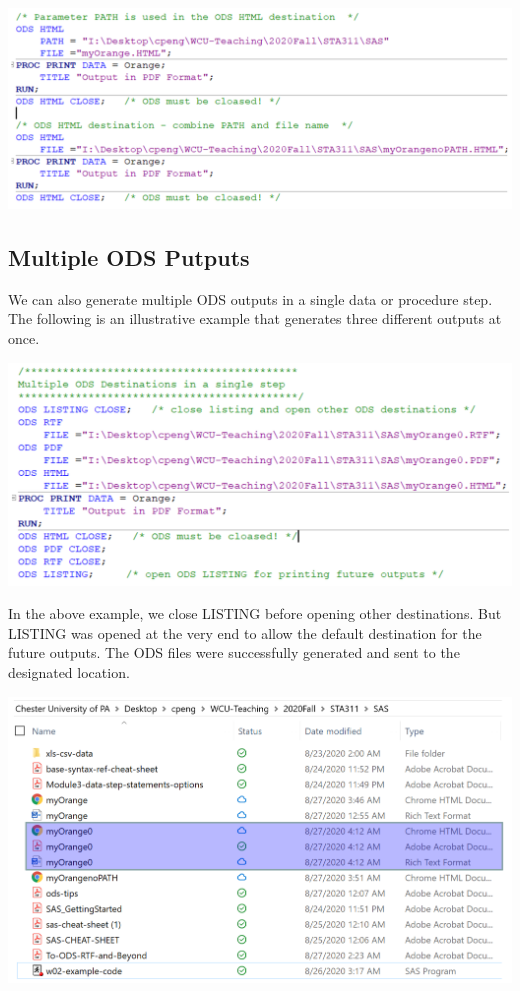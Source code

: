\documentclass[
]{book}
\begin{document}
\begin{center}\includegraphics[width=1\linewidth]{img12/w12-ODS-HTML} \end{center}

\hypertarget{multiple-ods-putputs}{%
\subsection{Multiple ODS Putputs}\label{multiple-ods-putputs}}

We can also generate multiple ODS outputs in a single data or procedure step. The following is an illustrative example that generates three different outputs at once.

\begin{center}\includegraphics[width=1\linewidth]{img12/w12-multiple-ODS-outputs} \end{center}

In the above example, we close LISTING before opening other destinations. But LISTING was opened at the very end to allow the default destination for the future outputs. The ODS files were successfully generated and sent to the designated location.

\begin{center}\includegraphics[width=1\linewidth]{img12/w12-three-ods-files-location} \end{center}
\end{document}
